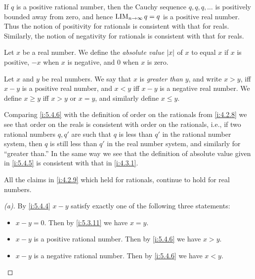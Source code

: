 \begin{note}
  If \(q\) is a positive rational number, then the Cauchy sequence \(q, q, q, \dots\) is positively bounded away from zero, and hence \(\operatorname*{LIM}_{n \to \infty} q = q\) is a positive real number.
  Thus the notion of positivity for rationals is consistent with that for reals.
  Similarly, the notion of negativity for rationals is consistent with that for reals.
\end{note}

\begin{defn}\label{i:5.4.5}
  Let \(x\) be a real number.
  We define the \emph{absolute value} \(\left\lvert x\right\rvert\) of \(x\) to equal \(x\) if \(x\) is positive, \(-x\) when \(x\) is negative, and \(0\) when \(x\) is zero.
\end{defn}

\begin{defn}\label{i:5.4.6}
  Let \(x\) and \(y\) be real numbers.
  We say that \(x\) is \emph{greater than} \(y\), and write \(x > y\), iff \(x - y\) is a positive real number, and \(x < y\) iff \(x - y\) is a negative real number.
  We define \(x \geq y\) iff \(x > y\) or \(x = y\), and similarly define \(x \leq y\).
\end{defn}

\begin{note}
  Comparing \cref{i:5.4.6} with the definition of order on the rationals from \cref{i:4.2.8} we see that order on the reals is consistent with order on the rationals, i.e., if two rational numbers \(q, q'\) are such that \(q\) is less than \(q'\) in the rational number system, then \(q\) is still less than \(q'\) in the real number system, and similarly for ``greater than.''
  In the same way we see that the definition of absolute value given in \cref{i:5.4.5} is consistent with that in \cref{i:4.3.1}.
\end{note}

\begin{prop}\label{i:5.4.7}
  All the claims in \cref{i:4.2.9} which held for rationals, continue to hold for real numbers.
\end{prop}

\begin{proof}[(a)]
  By \cref{i:5.4.4} \(x - y\) satisfy exactly one of the following three statements:
  \begin{itemize}
    \item \(x - y = 0\).
          Then by \cref{i:5.3.11} we have \(x = y\).
    \item \(x - y\) is a positive rational number.
          Then by \cref{i:5.4.6} we have \(x > y\).
    \item \(x - y\) is a negative rational number.
          Then by \cref{i:5.4.6} we have \(x < y\).
  \end{itemize}
\end{proof}

